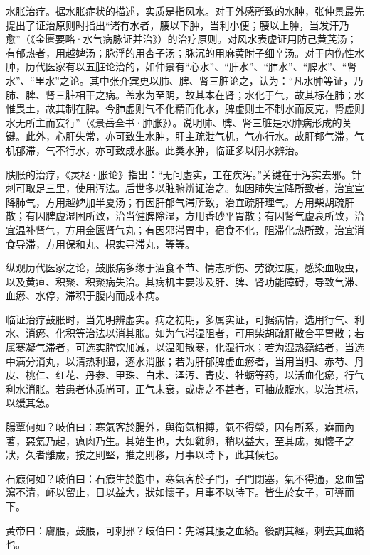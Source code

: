 \documentclass[draft,12pt]{ctexbook}
\begin{document}

水胀治疗。据水胀症状的描述，实质是指风水。对于外感所致的水肿，张仲景最先提出了证治原则时指出“诸有水者，腰以下肿，当利小便；腰以上肿，当发汗乃愈”（《金匮要略·水气病脉证并治》）的治疗原则。对风水表虚证用防己黄芪汤；有郁热者，用越婢汤；脉浮的用杏子汤；脉沉的用麻黄附子细辛汤。对于内伤性水肿，历代医家有以五脏论治的，如仲景有“心水”、“肝水”、“肺水”、“脾水”、“肾水”、“里水”之论。其中张介宾更以肺、脾、肾三脏论之，认为：“凡水肿等证，乃肺、脾、肾三脏相干之病。盖水为至阴，故其本在肾；水化于气，故其标在肺；水惟畏土，故其制在脾。今肺虚则气不化精而化水，脾虚则土不制水而反克，肾虚则水无所主而妄行”（《景岳全书·肿胀》）。说明肺、脾、肾三脏是水肿病形成的关键。此外，心肝失常，亦可致生水肿，肝主疏泄气机，气亦行水。故肝郁气滞，气机郁滞，气不行水，亦可致成水胀。此类水肿，临证多以阴水辨治。

肤胀的治疗，《灵枢·胀论》指出：“无问虚实，工在疾泻。”关键在于泻实去邪。针刺可取足三里，使用泻法。后世多以脏腑辨证治之。如因肺失宣降所致者，治宜宣降肺气，方用越婢加半夏汤；有因肝郁气滞所致，治宜疏肝理气，方用柴胡疏肝散；有因脾虚湿困所致，治当健脾除湿，方用香砂平胃散；有因肾气虚衰所致，治宜温补肾气，方用金匮肾气丸；有因邪滞胃中，宿食不化，阻滞化热所致，治宜消食导滞，方用保和丸、枳实导滞丸，等等。

纵观历代医家之论，鼓胀病多缘于酒食不节、情志所伤、劳欲过度，感染血吸虫，以及黄疸、积聚、积聚病失治。其病机主要涉及肝、脾、肾功能障碍，导致气滞、血瘀、水停，滞积于腹内而成本病。

临证治疗鼓胀时，当先明辨虚实。病之初期，多属实证，可据病情，选用行气、利水、消瘀、化积等治法以消其胀。如为气滞湿阻者，可用柴胡疏肝散合平胃散；若属寒凝气滞者，可选实脾饮加减，以温阳散寒，化湿行水；若为湿热蕴结者，当选中满分消丸，以清热利湿，逐水消胀；若为肝郁脾虚血瘀者，当用当归、赤芍、丹皮、桃仁、红花、丹参、甲珠、白术、泽泻、青皮、牡蛎等药，以活血化瘀，行气利水消胀。若患者体质尚可，正气未衰，或虚之不甚者，可抽放腹水，以治其标，以缓其急。


\begin{yuanwen}
腸覃何如？岐伯曰：寒氣客於腸外，舆衛氣相搏，氣不得榮，因有所系，癖而內著，惡氣乃起，瘜肉乃生。其始生也，大如雞卵，稍以益大，至其成，如懷子之狀，久者離歲，按之則堅，推之則移，月事以時下，此其候也。

石瘕何如？岐伯曰：石瘕生於胞中，寒氣客於子門，子門閉塞，氣不得通，惡血當瀉不清，衃以留止，日以益大，狀如懷子，月事不以時下。皆生於女子，可導而下。

黃帝曰：膚脹，鼓脹，可刺邪？岐伯曰：先瀉其脹之血絡。後調其經，刺去其血絡也。
\end{yuanwen}
\end{document}
